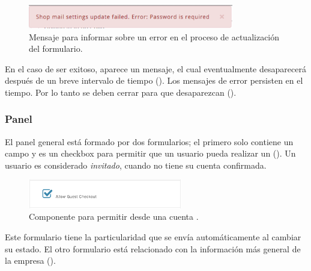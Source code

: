 \begin{figure}[H]
	\centering
	\includegraphics[width=0.8\textwidth]{figuras/dashboard/ecommerce/error_message.png}
	\caption{Mensaje para informar sobre un error en el proceso de actualización del formulario.}
	\label{figure:dashboard:ecommerce:error_message}
\end{figure}

En el caso de ser exitoso, aparece un mensaje, el cual eventualmente desaparecerá después de un breve intervalo de tiempo (). Los mensajes de error persisten en el tiempo. Por lo tanto se deben cerrar para que desaparezcan ().


\subsubsection*{Panel \generalPanel}

El panel general está formado por dos formularios; el primero solo contiene un campo y es un checkbox para permitir que un usuario \userGuestAccount pueda realizar un \checkoutCOM (). Un usuario es considerado \textit{invitado}, cuando no tiene su cuenta confirmada.

\begin{figure}[H]
	\centering
	\includegraphics[width=0.6\textwidth]{figuras/dashboard/ecommerce/general_menu/allow_checkout.png}
	\caption{Componente para permitir \checkoutCOM desde una cuenta \userGuestAccount.}
	\label{figure:dashboard:ecommerce:general_menu:allow_checkout}
\end{figure}

Este formulario tiene la particularidad que se envía automáticamente al cambiar su estado.
El otro formulario está relacionado con la información más general de la empresa ().

